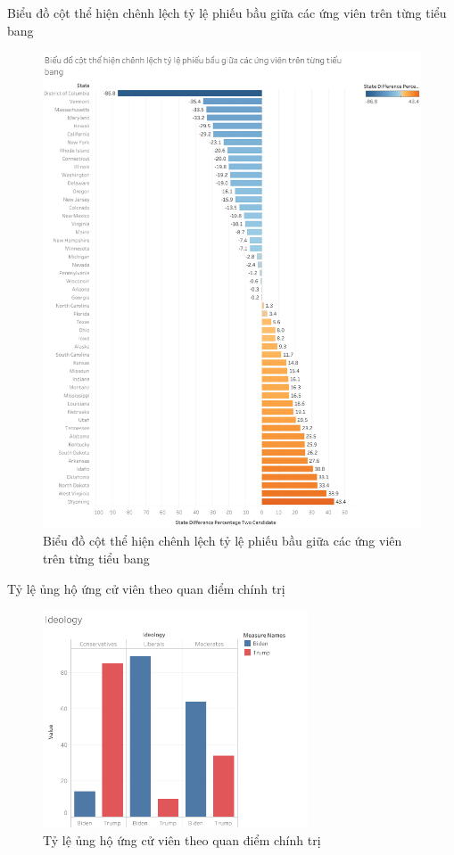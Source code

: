 \documentclass[10pt]{beamer}
\theoremstyle{remark}
\theoremstyle{definition}
\begin{document}
\begin{frame}{Biểu đồ cột thể hiện chênh lệch tỷ lệ phiếu bầu giữa các ứng viên trên từng tiểu bang}
	\begin{figure}[h!]
		\centering
		\includegraphics[height=0.7\textheight]{figures/State_Difference_Percentage_Total_Vote_Two_Candidate_Bar_Chart.png}
		\caption{Biểu đồ cột thể hiện chênh lệch tỷ lệ phiếu bầu giữa các ứng viên trên từng tiểu bang}
	\end{figure}
\end{frame}


\begin{frame}{Tỷ lệ ủng hộ ứng cử viên theo quan điểm chính trị}
	\begin{figure}[h!]
        \centering
        \includegraphics[width=0.7\textwidth]{figures/Ideology.png}
        \caption{Tỷ lệ ủng hộ ứng cử viên theo quan điểm chính trị}
    \end{figure}
\end{frame}
\end{document}
